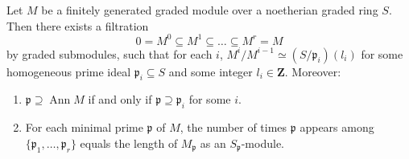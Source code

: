 Let $M$ be a finitely generated graded module over a noetherian graded ring $S$. Then there exists a filtration
$$0 = M^0 \subseteq M^1 \subseteq \ldots \subseteq M^r = M$$
by graded submodules, such that for each $i$, $M^i / M^{i-1} \simeq (S/\mathfrak{p}_i)(l_i)$ for some homogeneous prime ideal $\mathfrak{p}_i \subseteq S$ and some integer $l_i \in \mathbf{Z}$. Moreover:
\begin{enumerate}
  \item[(a)] $\mathfrak{p} \supseteq \operatorname{Ann} M$ if and only if $\mathfrak{p} \supseteq \mathfrak{p}_i$ for some $i$.
  \item[(b)] For each minimal prime $\mathfrak{p}$ of $M$, the number of times $\mathfrak{p}$ appears among $\{\mathfrak{p}_1, \ldots, \mathfrak{p}_r\}$ equals the length of $M_{\mathfrak{p}}$ as an $S_{\mathfrak{p}}$-module.
\end{enumerate}
